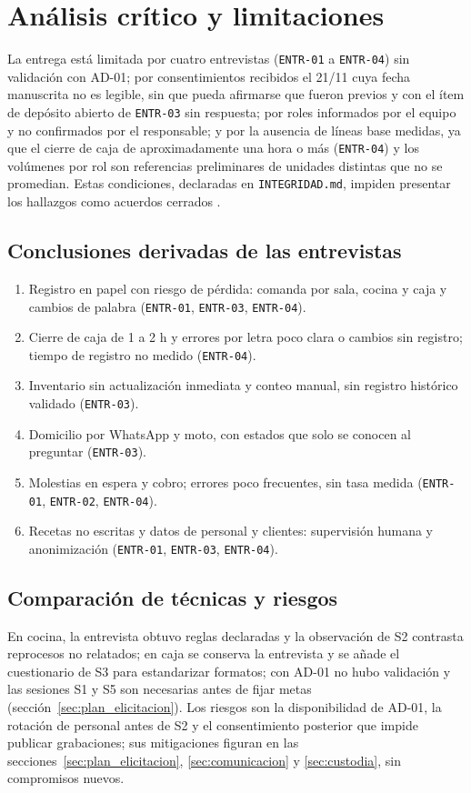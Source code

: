 \section{An\'alisis cr\'itico y limitaciones}

La entrega est\'a limitada por cuatro entrevistas (\texttt{ENTR-01} a \texttt{ENTR-04}) sin validaci\'on con AD-01; por consentimientos recibidos el 21/11 cuya fecha manuscrita no es legible, sin que pueda afirmarse que fueron previos y con el \'item de dep\'osito abierto de \texttt{ENTR-03} sin respuesta; por roles informados por el equipo y no confirmados por el responsable; y por la ausencia de l\'ineas base medidas, ya que el cierre de caja de aproximadamente una hora o m\'as (\texttt{ENTR-04}) y los vol\'umenes por rol son referencias preliminares de unidades distintas que no se promedian. Estas condiciones, declaradas en \texttt{INTEGRIDAD.md}, impiden presentar los hallazgos como acuerdos cerrados \cite{iso29148}.

\subsection{Conclusiones derivadas de las entrevistas}
\begin{enumerate}[leftmargin=18pt,itemsep=1pt]
    \item Registro en papel con riesgo de p\'erdida: comanda por sala, cocina y caja y cambios de palabra (\texttt{ENTR-01}, \texttt{ENTR-03}, \texttt{ENTR-04}).
    \item Cierre de caja de 1 a 2 h y errores por letra poco clara o cambios sin registro; tiempo de registro no medido (\texttt{ENTR-04}).
    \item Inventario sin actualizaci\'on inmediata y conteo manual, sin registro hist\'orico validado (\texttt{ENTR-03}).
    \item Domicilio por WhatsApp y moto, con estados que solo se conocen al preguntar (\texttt{ENTR-03}).
    \item Molestias en espera y cobro; errores poco frecuentes, sin tasa medida (\texttt{ENTR-01}, \texttt{ENTR-02}, \texttt{ENTR-04}).
    \item Recetas no escritas y datos de personal y clientes: supervisi\'on humana y anonimizaci\'on (\texttt{ENTR-01}, \texttt{ENTR-03}, \texttt{ENTR-04}).
\end{enumerate}

\subsection{Comparaci\'on de t\'ecnicas y riesgos}
En cocina, la entrevista obtuvo reglas declaradas y la observaci\'on de S2 contrasta reprocesos no relatados; en caja se conserva la entrevista y se a\~nade el cuestionario de S3 para estandarizar formatos; con AD-01 no hubo validaci\'on y las sesiones S1 y S5 son necesarias antes de fijar metas (secci\'on~\ref{sec:plan_elicitacion}). Los riesgos son la disponibilidad de AD-01, la rotaci\'on de personal antes de S2 y el consentimiento posterior que impide publicar grabaciones; sus mitigaciones figuran en las secciones~\ref{sec:plan_elicitacion}, \ref{sec:comunicacion} y \ref{sec:custodia}, sin compromisos nuevos.
